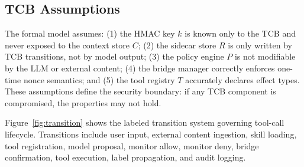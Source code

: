 \documentclass[sigconf,anonymous,review]{acmart}
\begin{document}
\subsection{TCB Assumptions}

The formal model assumes: (1) the HMAC key $k$ is known only to the TCB and never exposed to the context store $C$; (2) the sidecar store $R$ is only written by TCB transitions, not by model output; (3) the policy engine $P$ is not modifiable by the LLM or external content; (4) the bridge manager correctly enforces one-time nonce semantics; and (5) the tool registry $T$ accurately declares effect types. These assumptions define the security boundary: if any TCB component is compromised, the properties may not hold.

Figure~\ref{fig:transition} shows the labeled transition system governing tool-call lifecycle. Transitions include user input, external content ingestion, skill loading, tool registration, model proposal, monitor allow, monitor deny, bridge confirmation, tool execution, label propagation, and audit logging.
\end{document}
